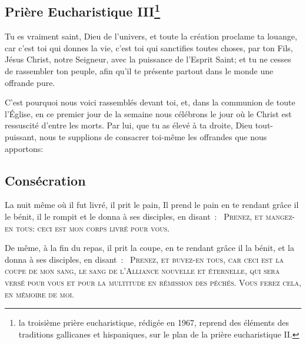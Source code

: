 \subsection{Prière Eucharistique III\footnote{la troisième prière eucharistique, rédigée en 1967, reprend des 
éléments des traditions gallicanes et hispaniques, sur le plan de la 
prière eucharistique II.}}\label{pe3}

Tu es vraiment saint, Dieu de l'univers,
et toute la création proclame ta louange,
car c'est toi qui donnes la vie,
c'est toi qui sanctifies toutes choses,
par ton Fils, Jésus Christ, notre Seigneur,
avec la puissance de l'Esprit Saint;
et tu ne cesses de rassembler ton peuple,
afin qu'il te présente
partout dans le monde
une offrande pure.


C'est pourquoi nous voici rassemblés devant toi,
et, dans la communion de toute l'Église,
en ce premier jour de la semaine
nous célébrons le jour
où le Christ est ressuscité d'entre les morts.
Par lui, que tu as élevé à ta droite,
Dieu tout-puissant, nous te supplions
de consacrer toi-même
les offrandes que nous apportons:

\subsection{Consécration}

La nuit même où il fut livré, il prit le pain, Il prend le pain
en te rendant grâce il le bénit, il le rompit
et le donna à ses disciples, en disant~: 
\textsc{\og~Prenez, et mangez-en tous:} 
\textsc{ceci est mon corps livré pour vous.~\fg}


De même, à la fin du repas,
il prit la coupe, 
en te rendant grâce il la bénit,
et la donna à ses disciples, en disant~:
\textsc{\og~Prenez, et buvez-en tous,} 
\textsc{car ceci est la coupe de mon sang,
le sang de l'Alliance nouvelle et éternelle,
qui sera versé
pour vous et pour la multitude
en rémission des péchés.
Vous ferez cela, en mémoire de moi.~\fg}




